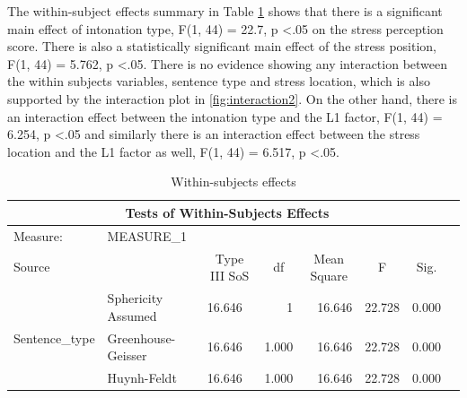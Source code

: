 \documentclass[a4paper]{article}
\begin{document}
The within-subject effects summary in Table \ref{tab:withinsub2} shows that there is a significant main effect of intonation type, F(1, 44) = 22.7, p \textless .05 on the stress perception score. There is also a statistically significant main effect of the stress position, F(1, 44) = 5.762, p \textless .05. There is no evidence showing any interaction between the within subjects variables, sentence type and stress location, which is also supported by the interaction plot in \ref{fig:interaction2}. On the other hand, there is an interaction effect between the intonation type and the L1 factor, F(1, 44) = 6.254, p \textless .05 and similarly there is an interaction effect between the stress location and the L1 factor as well,  F(1, 44) = 6.517, p \textless .05.


\begin{table}[H]
  \begin{center}
      \caption{Within-subjects effects}
      \label{tab:withinsub2}
\begin{tabular}{p{}p{}|l|r|r|r|r|r|} 
\hline
\multicolumn{7}{|c|}{Tests of Within-Subjects Effects}                                                                                                                                                                              \\ 
\hline
Measure:~                                               & MEASURE\_1         & \multicolumn{1}{l|}{}             & \multicolumn{1}{l|}{}   & \multicolumn{1}{l|}{}            & \multicolumn{1}{l|}{}  & \multicolumn{1}{l|}{}      \\ 
\hline
Source                                                  & ~                  & \multicolumn{1}{c|}{Type III SoS} & \multicolumn{1}{c|}{df} & \multicolumn{1}{c|}{Mean Square} & \multicolumn{1}{c|}{F} & \multicolumn{1}{c|}{Sig.}  \\ 
\hline
\multirow{4}{*}{Sentence\_type}                         & Sphericity Assumed & 16.646                            & 1                       & 16.646                           & 22.728                 & 0.000                      \\ 
\cline{2-7}
                                                        & Greenhouse-Geisser & 16.646                            & 1.000                   & 16.646                           & 22.728                 & 0.000                      \\ 
\cline{2-7}
                                                        & Huynh-Feldt        & 16.646                            & 1.000                   & 16.646                           & 22.728                 & 0.000                      \\ 

\end{tabular}
\end{center}
\end{table}
\end{document}
